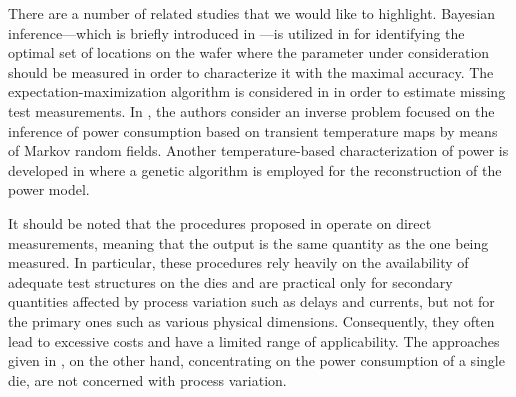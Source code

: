 There are a number of related studies that we would like to highlight. Bayesian
inference---which is briefly introduced in ---is
utilized in \cite{zhang2010} for identifying the optimal set of locations on the
wafer where the parameter under consideration should be measured in order to
characterize it with the maximal accuracy. The expectation-maximization
algorithm is considered in \cite{reda2009} in order to estimate missing test
measurements. In \cite{paek2012}, the authors consider an inverse problem
focused on the inference of power consumption based on transient temperature
maps by means of Markov random fields. Another temperature-based
characterization of power is developed in \cite{mesa-martinez2007} where a
genetic algorithm is employed for the reconstruction of the power model.

It should be noted that the procedures proposed in \cite{reda2009, zhang2010}
operate on direct measurements, meaning that the output is the same quantity as
the one being measured. In particular, these procedures rely heavily on the
availability of adequate test structures on the dies and are practical only for
secondary quantities affected by process variation such as delays and currents,
but not for the primary ones such as various physical dimensions. Consequently,
they often lead to excessive costs and have a limited range of applicability.
The approaches given in \cite{mesa-martinez2007, paek2012}, on the other hand,
concentrating on the power consumption of a single die, are not concerned with
process variation.

